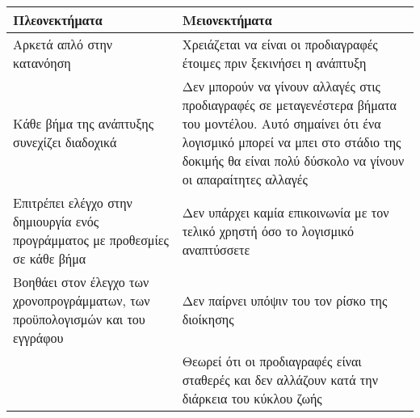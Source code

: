 \begin{center}
    \begin{tabular}{| p{8cm} | p{8cm} |}
        \hline
        \textbf{Πλεονεκτήματα} & \textbf{Μειονεκτήματα} \\
        \hline
        Αρκετά απλό στην κατανόηση & Χρειάζεται να είναι οι προδιαγραφές έτοιμες πριν ξεκινήσει η ανάπτυξη \\
        \hline
        Κάθε βήμα της ανάπτυξης συνεχίζει διαδοχικά & Δεν μπορούν να γίνουν αλλαγές στις προδιαγραφές σε μεταγενέστερα βήματα του μοντέλου. Αυτό σημαίνει ότι ένα λογισμικό μπορεί να μπει στο στάδιο της δοκιμής θα είναι πολύ δύσκολο να γίνουν οι απαραίτητες αλλαγές \\
        \hline
        Επιτρέπει ελέγχο στην δημιουργία ενός προγράμματος με προθεσμίες σε κάθε βήμα & Δεν υπάρχει καμία επικοινωνία με τον τελικό χρηστή όσο το λογισμικό αναπτύσσετε \\
        \hline
        Βοηθάει στον έλεγχο των χρονοπρογράμματων, των προϋπολογισμών  και του εγγράφου & Δεν παίρνει υπόψιν του τον ρίσκο της διοίκησης \\
        \hline
        & Θεωρεί ότι οι προδιαγραφές είναι σταθερές και δεν αλλάζουν κατά την διάρκεια του κύκλου ζωής  \\
        \hline
    \end{tabular}
\end{center}
